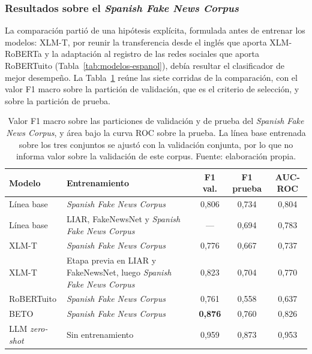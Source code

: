 \subsubsection{Resultados sobre el \textit{Spanish Fake News Corpus}}
\label{sec:resultados-sfnc}

La comparación partió de una hipótesis explícita, formulada antes de entrenar los modelos: XLM-T, por reunir la transferencia desde el inglés que aporta XLM-RoBERTa y la adaptación al registro de las redes sociales que aporta RoBERTuito (Tabla~\ref{tab:modelos-espanol}), debía resultar el clasificador de mejor desempeño. La Tabla~\ref{tab:resultados-sfnc} reúne las siete corridas de la comparación, con el valor F1 macro sobre la partición de validación, que es el criterio de selección, y sobre la partición de prueba.

\begin{table}[t]
  \centering
  \small
  \caption{Valor F1 macro sobre las particiones de validación y de prueba del \textit{Spanish Fake News Corpus}, y área bajo la curva ROC sobre la prueba. La línea base entrenada sobre los tres conjuntos se ajustó con la validación conjunta, por lo que no informa valor sobre la validación de este corpus. Fuente: elaboración propia.}
  \label{tab:resultados-sfnc}
  \begin{tabular}{@{}l >{\raggedright\arraybackslash}p{4.6cm} c c c@{}}
    \hline
    \textbf{Modelo} & \textbf{Entrenamiento} & \textbf{F1 val.} & \textbf{F1 prueba} & \textbf{AUC-ROC} \\
    \hline
    Línea base & \textit{Spanish Fake News Corpus} & 0,806 & 0,734 & 0,804 \\
    Línea base & LIAR, FakeNewsNet y \textit{Spanish Fake News Corpus} & --- & 0,694 & 0,783 \\
    XLM-T & \textit{Spanish Fake News Corpus} & 0,776 & 0,667 & 0,737 \\
    XLM-T & Etapa previa en LIAR y FakeNewsNet, luego \textit{Spanish Fake News Corpus} & 0,823 & 0,704 & 0,770 \\
    RoBERTuito & \textit{Spanish Fake News Corpus} & 0,761 & 0,558 & 0,637 \\
    BETO & \textit{Spanish Fake News Corpus} & \textbf{0,876} & 0,760 & 0,826 \\
    \hline
    LLM \textit{zero-shot} & Sin entrenamiento & 0,959 & 0,873 & 0,953 \\
    \hline
  \end{tabular}
\end{table}

